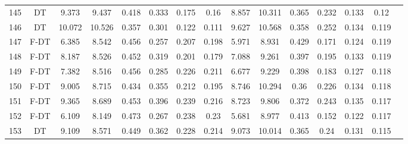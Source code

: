 \begin{longtable}{@{\hskip3pt}c@{\hskip3pt}c@{\hskip3pt}c@{\hskip3pt}c@{\hskip3pt}c@{\hskip3pt}c@{\hskip3pt}c@{\hskip3pt}c@{\hskip3pt}c@{\hskip3pt}c@{\hskip3pt}c@{\hskip3pt}c@{\hskip3pt}c@{\hskip3pt}c@{\hskip3pt}c}
        145 &             DT &             9.373 &          9.437 &           0.418 &           0.333 &           0.175 &            0.16 &               8.857 &          10.311 &           0.365 &         0.232 &          0.133 &            0.12 \\
        146 &             DT &            10.072 &         10.526 &           0.357 &           0.301 &           0.122 &           0.111 &               9.627 &          10.568 &           0.358 &         0.252 &          0.134 &           0.119 \\
        147 &           F-DT &             6.385 &          8.542 &           0.456 &           0.257 &           0.207 &           0.198 &               5.971 &           8.931 &           0.429 &         0.171 &          0.124 &           0.119 \\
        148 &           F-DT &             8.187 &          8.526 &           0.452 &           0.319 &           0.201 &           0.179 &               7.088 &           9.261 &           0.397 &         0.195 &          0.133 &           0.119 \\
        149 &           F-DT &             7.382 &          8.516 &           0.456 &           0.285 &           0.226 &           0.211 &               6.677 &           9.229 &           0.398 &         0.183 &          0.127 &           0.118 \\
        150 &           F-DT &             9.005 &          8.715 &           0.434 &           0.355 &           0.212 &           0.195 &               8.746 &          10.294 &            0.36 &         0.226 &          0.134 &           0.118 \\
        151 &           F-DT &             9.365 &          8.689 &           0.453 &           0.396 &           0.239 &           0.216 &               8.723 &           9.806 &           0.372 &         0.243 &          0.135 &           0.117 \\
        152 &           F-DT &             6.109 &          8.149 &           0.473 &           0.267 &           0.238 &            0.23 &               5.681 &           8.977 &           0.413 &         0.152 &          0.122 &           0.117 \\
        153 &             DT &             9.109 &          8.571 &           0.449 &           0.362 &           0.228 &           0.214 &               9.073 &          10.014 &           0.365 &          0.24 &          0.131 &           0.115 \\

\end{longtable}

